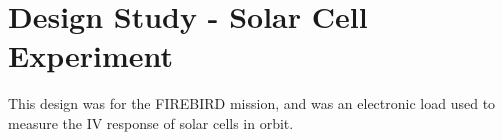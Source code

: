 \chapter{Design Study - Solar Cell Experiment}\label{CH:Design1}
This design was for the FIREBIRD mission, and was an electronic load used to measure the IV response of solar cells in orbit.
